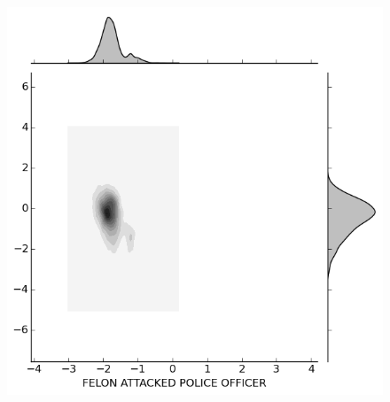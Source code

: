 \begin{figure}[H]
\begin{minipage}[b]{0.30\linewidth}
  \end{minipage}
  \quad
  \begin{minipage}[b]{0.30\linewidth}
    \includegraphics[width=\linewidth]{images/subcircum/FELON_ATTACKED_POLICE_OFFICER.png}
  \end{minipage}


\end{figure}
